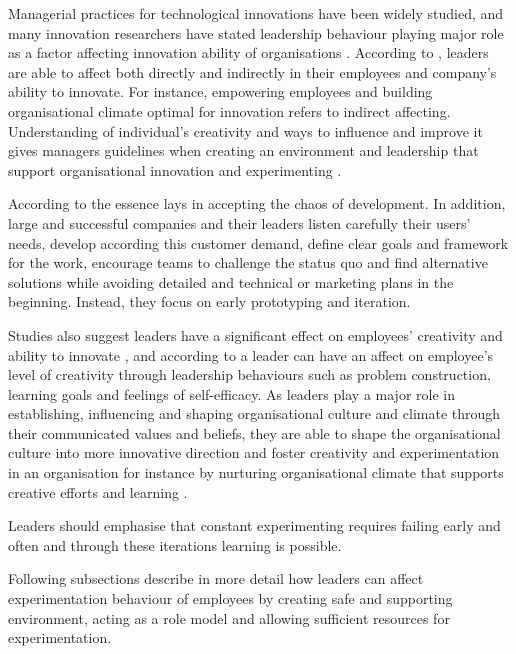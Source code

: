 Managerial practices for technological innovations have been widely studied, and many innovation researchers have stated leadership behaviour playing major role as a factor affecting innovation ability of organisations \citep{buijs2007innovation,jung2003role,jung2001transformational,amabile1998kill,mumford1988creativity}. According to \citet{jung2003role}, leaders are able to affect both directly and indirectly in their employees and company's ability to innovate. For instance, empowering employees and building organisational climate optimal for innovation refers to indirect affecting. Understanding of individual's creativity and ways to influence and improve it gives managers guidelines when creating an environment and leadership that support organisational innovation and experimenting \citep{redmond1993putting}. 

According to \citet{quinn1985managing} the essence lays in accepting the chaos of development. In addition, large and successful companies and their leaders listen carefully their users' needs, develop according this customer demand, define clear goals and framework for the work, encourage teams to challenge the status quo and find alternative solutions while avoiding detailed and technical or marketing plans in the beginning. Instead, they focus on early prototyping and iteration. \citep{quinn1985managing}

 Studies also suggest leaders have a significant effect on employees' creativity and ability to innovate \citep{mumford2002leading,jung2001transformational,amabile1998kill,hennessey19881}, and according to \citet{redmond1993putting} a leader can have an affect on employee's level of creativity through leadership behaviours such as problem construction, learning goals and feelings of self-efficacy. As leaders play a major role in establishing, influencing and shaping organisational culture and climate through their communicated values and beliefs, they are able to shape the organisational culture into more innovative direction and foster creativity and experimentation in an organisation \citep{jung2003role,schein2010organizational} for instance by nurturing organisational climate that supports creative efforts and learning \citep{yukl2002leadership}. 
 
 Leaders should emphasise that constant experimenting requires failing early and often and through these iterations learning is possible. \citep{amabile2008creativity, amabile1996assessing} 

Following subsections describe in more detail how leaders can affect experimentation behaviour of employees by creating safe and supporting environment, acting as a role model and allowing sufficient resources for experimentation. 

